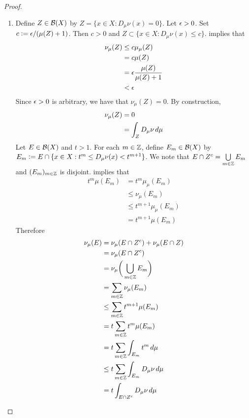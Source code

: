 \documentclass{book}
\begin{document}
	\begin{proof}\
		\begin{enumerate}
			\item Define $Z \in \mathcal{B}(X)$ by $Z = \{x \in X: D_{\mu}\nu(x) = 0\}$. Let $\epsilon > 0$. Set $c \vcentcolon= \epsilon/(\mu(Z) + 1)$. Then $c > 0$ and $Z \subset \{x \in X: D_{\mu}\nu(x) \leq c \}$.  implies that
			\begin{align*}
				\nu_{\mu}(Z) 
				& \leq c \mu_{\mu}(Z) \\
				& = c \mu(Z) \\
				& = \epsilon \frac{\mu(Z)}{\mu(Z) + 1} \\
				& < \epsilon 
			\end{align*} 
			Since $\epsilon > 0$ is arbitrary, we have that $\nu_{\mu}(Z) = 0$. By construction, 
			\begin{align*}
				\nu_{\mu}(Z) 
				& = 0 \\
				& = \int_{Z} D_{\mu}\nu \, d \mu 
			\end{align*} 
			Let $E \in \mathcal{B}(X)$ and $t > 1$. For each $m \in \mathbb{Z}$, define $E_m \in \mathcal{B}(X)$ by $E_m \vcentcolon= E \cap \{x \in X: t^m \leq D_{\mu}\nu(x) < t^{m+1}\}$. We note that $E \cap Z^c = \bigcup\limits_{m \in \mathbb{Z}} E_m$ and $(E_m)_{m \in \mathbb{Z}}$ is disjoint.  implies that 
			\begin{align*}
				t^m \mu(E_m)
				& = t^m\mu_{\mu}(E_m) \\
				& \leq \nu_{\mu}(E_m) \\
				& \leq t^{m+1}\mu_{\mu}(E_m) \\
				& = t^{m+1} \mu(E_m)
			\end{align*}
			Therefore
			\begin{align*}
				\nu_{\mu}(E)
				& = \nu_{\mu}(E \cap Z^c) + \nu_{\mu}(E \cap Z) \\
				& = \nu_{\mu}(E \cap Z^c) \\
				& = \nu_{\mu} \bigg( \bigcup_{m \in \Z} E_m \bigg) \\
				& = \sum\limits_{m \in \Z} \nu_{\mu}(E_m) \\
				& \leq \sum\limits_{m \in \Z} t^{m+1} \mu(E_m) \\
				& = t\sum\limits_{m \in \Z} t^m \mu(E_m) \\
				& = t\sum\limits_{m \in \Z} \int_{E_m} t^m \dmu \\
				& \leq t \sum\limits_{m \in \Z} \int_{E_m} D_{\mu} \nu \dmu \\
				& = t \int_{E\cap Z^c}  D_{\mu} \nu \dmu \\ 

\end{align*}
\end{enumerate}
\end{proof}
\end{document}
